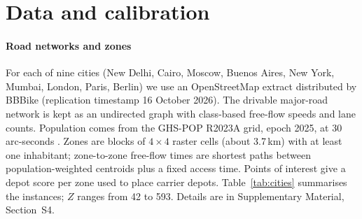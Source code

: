 \documentclass[preprint,11pt]{elsarticle}
\theoremstyle{definition}
\theoremstyle{remark}
\newcommand{\SM}[1]{Supplementary Material, Section~#1}
\begin{document}
\section{Data and calibration}\label{sec:data}

\paragraph{Road networks and zones} For each of nine cities (New Delhi, Cairo, Moscow, Buenos Aires, New York, Mumbai, London, Paris, Berlin) we use an OpenStreetMap extract \citep{Haklay2008} distributed by BBBike (replication timestamp 16 October 2026). The drivable major-road network is kept as an undirected graph with class-based free-flow speeds and lane counts. Population comes from the GHS-POP R2023A grid, epoch 2025, at 30 arc-seconds \citep{GHSPOP2023}. Zones are blocks of $4\times4$ raster cells (about 3.7\,km) with at least one inhabitant; zone-to-zone free-flow times are shortest paths between population-weighted centroids plus a fixed access time. Points of interest give a depot score per zone used to place carrier depots. Table~\ref{tab:cities} summarises the instances; $Z$ ranges from 42 to 593. Details are in \SM{S4}.

\begin{table}[tbp]\centering\small
\caption{City instances. $Z$: zones; population from GHS-POP inside the zones; major road and lane kilometres inside the zones; nodes of the major-road graph; $N$: number of carriers.}\label{tab:cities}
\end{table}
\end{document}
